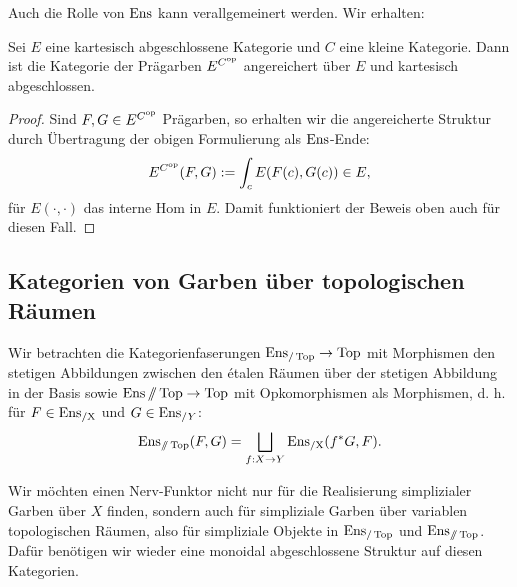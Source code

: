 Auch die Rolle von $\operatorname{Ens}$ kann verallgemeinert werden. Wir erhalten:
\begin{prop} \label{presheaf-cart-closed}
  Sei $E$ eine kartesisch abgeschlossene Kategorie und $C$ eine kleine
  Kategorie. Dann ist die Kategorie der Prägarben $E^{C^\mathrm{op}}$
  angereichert über $E$ und kartesisch abgeschlossen.
\end{prop}
\begin{proof}
  Sind $F, G \in E^{C^\mathrm{op}}$ Prägarben, so erhalten wir die
  angereicherte Struktur durch Übertragung der obigen Formulierung als
  $\operatorname{Ens}$-Ende:
  \[ E^{C^\mathrm{op}}(F, G) := \int_c E(F(c), G(c)) \in E, \]
  für $E(\cdot, \cdot)$ das interne Hom in $E$. Damit funktioniert der
  Beweis oben auch für diesen Fall.
\end{proof}

\subsection{Kategorien von Garben über topologischen Räumen}

Wir betrachten die Kategorienfaserungen $\operatorname{Ens}_{/\operatorname{Top}} \to \operatorname{Top}$ mit
Morphismen den stetigen Abbildungen zwischen den étalen Räumen über
der stetigen Abbildung in der Basis sowie $\operatorname{Ens}{\mathbin{/\mkern-6mu/} \operatorname{Top}} \to
\operatorname{Top}$ mit Opkomorphismen als Morphismen, d. h. für $F \in \operatorname{Ens_{/X}}$ und
$G \in \operatorname{Ens}_{/Y}$:
\[ \operatorname{Ens}_{\mathbin{/\mkern-6mu/} \operatorname{Top}}(F, G) = \bigsqcup_{f: X \to Y} \operatorname{Ens_{/X}}(f^* G, F). \]

Wir möchten einen Nerv-Funktor nicht nur für die Realisierung
simplizialer Garben über $X$ finden, sondern auch für simpliziale
Garben über variablen topologischen Räumen, also für simpliziale
Objekte in $\operatorname{Ens}_{/\operatorname{Top}}$ und $\operatorname{Ens}_{\mathbin{/\mkern-6mu/} \operatorname{Top}}$. Dafür benötigen
wir wieder eine monoidal abgeschlossene Struktur auf diesen
Kategorien.

